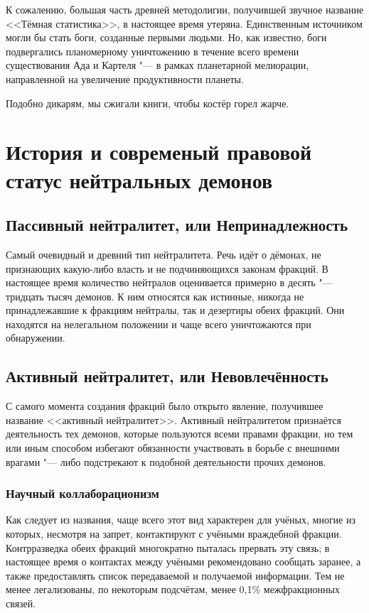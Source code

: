 К сожалению, большая часть древней методолигии, получившей звучное название <<Тёмная статистика>>, в настоящее время утеряна.
Единственным источником могли бы стать боги, созданные первыми людьми.
Но, как известно, боги подвергались планомерному уничтожению в течение всего времени существования Ада и Картеля "--- в рамках планетарной мелиорации, направленной на увеличение продуктивности планеты.

Подобно дикарям, мы сжигали книги, чтобы костёр горел жарче.

\section{История и современый правовой статус нейтральных демонов}

\subsection{Пассивный нейтралитет, или Непринадлежность}

Самый очевидный и древний тип нейтралитета.
Речь идёт о дёмонах, не признающих какую-либо власть и не подчиняющихся законам фракций.
В настоящее время количество нейтралов оценивается примерно в десять "--- тридцать тысяч демонов.
К ним относятся как истинные, никогда не принадлежавшие к фракциям нейтралы, так и дезертиры обеих фракций.
Они находятся на нелегальном положении и чаще всего уничтожаются при обнаружении.

\subsection{Активный нейтралитет, или Невовлечённость}

С самого момента создания фракций было открыто явление, получившее название <<активный нейтралитет>>.
Активный нейтралитетом признаётся деятельность тех демонов, которые пользуются всеми правами фракции, но тем или иным способом избегают обязанности участвовать в борьбе с внешними врагами "--- либо подстрекают к подобной деятельности прочих демонов.

\subsubsection{Научный коллаборационизм}

Как следует из названия, чаще всего этот вид характерен для учёных, многие из которых, несмотря на запрет, контактируют с учёными враждебной фракции.
Контрразведка обеих фракций многократно пыталась прервать эту связь;
в настоящее время о контактах между учёными рекомендовано сообщать заранее, а также предоставлять список передаваемой и получаемой информации.
Тем не менее легализованы, по некоторым подсчётам, менее 0,1\% межфракционных связей.

